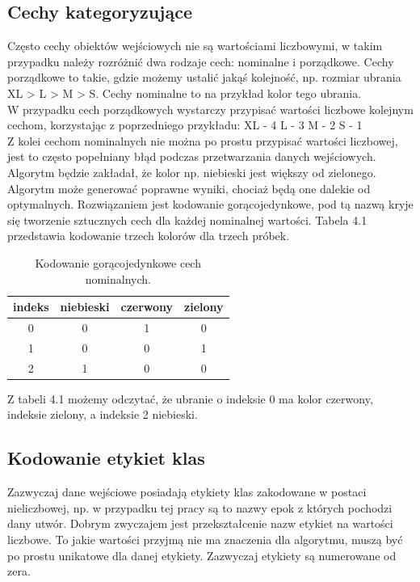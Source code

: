 \documentclass[printmode, eng, openany]{mgr}
\newcommand\tab[1][1cm]{\hspace*{#1}}
\begin{document}
\subsection{Cechy kategoryzujące}
\tab Często cechy obiektów wejściowych nie są wartościami liczbowymi, w takim przypadku należy rozróżnić dwa rodzaje cech: nominalne i porządkowe. Cechy porządkowe to takie, gdzie możemy ustalić jakąś kolejność, np. rozmiar ubrania XL > L > M > S. Cechy nominalne to na przykład kolor tego ubrania.\\
\tab W przypadku cech porządkowych wystarczy przypisać wartości liczbowe kolejnym cechom, korzystając z poprzedniego przykładu:
XL - 4
L - 3
M - 2
S - 1\\
\tab Z kolei cechom nominalnych nie można po prostu przypisać wartości liczbowej, jest to często popełniany błąd podczas przetwarzania danych wejściowych. Algorytm będzie zakładał, że kolor np. niebieski jest większy od zielonego. Algorytm może generować poprawne wyniki, chociaż będą one dalekie od optymalnych. Rozwiązaniem jest kodowanie gorącojedynkowe, pod tą nazwą kryje się tworzenie sztucznych cech dla każdej nominalnej wartości. Tabela 4.1 przedstawia kodowanie trzech kolorów dla trzech próbek.
\begin{table}[H]
\centering
\caption{Kodowanie gorącojedynkowe cech nominalnych.}
\begin{tabular}{c|c|c|c}

indeks & niebieski & czerwony & zielony \\
\hline
0 & 0 & 1 & 0 \\
\hline
1 & 0 & 0 & 1 \\
\hline
2 & 1 & 0 & 0 \\

\end{tabular}
\end{table}
Z tabeli 4.1 możemy odczytać, że ubranie o indeksie 0 ma kolor czerwony, indeksie zielony, a indeksie 2 niebieski.
\subsection{Kodowanie etykiet klas}
\tab Zazwyczaj dane wejściowe posiadają etykiety klas zakodowane w postaci nieliczbowej, np. w przypadku tej pracy są to nazwy epok z których pochodzi dany utwór. Dobrym zwyczajem jest przekształcenie nazw etykiet na wartości liczbowe. To jakie wartości przyjmą nie ma znaczenia dla algorytmu, muszą być po prostu unikatowe dla danej etykiety. Zazwyczaj etykiety są numerowane od zera. 
\end{document}
